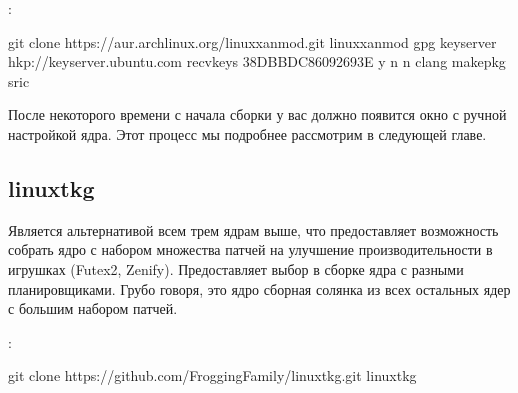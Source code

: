 \documentclass[letterpaper,10pt,russian,openany]{sphinxmanual}
\begin{document}
\sphinxAtStartPar
{}:

\begin{sphinxVerbatim}[commandchars=\\\{\}]
git clone https://aur.archlinux.org/linux\PYGZhy{}xanmod.git                    
 linux\PYGZhy{}xanmod                                                         
gpg \PYGZhy{}\PYGZhy{}keyserver hkp://keyserver.ubuntu.com \PYGZhy{}\PYGZhy{}recv\PYGZhy{}keys 38DBBDC86092693E 
 y n n clang         
makepkg \PYGZhy{}sric                                                           
\end{sphinxVerbatim}

\sphinxAtStartPar
После некоторого времени с начала сборки у вас должно появится окно с ручной настройкой ядра.
Этот процесс мы подробнее рассмотрим в следующей главе.

\noindent{}

\ignorespaces 

\subsection{linux\sphinxhyphen{}tkg}
\label{\detokenize{source/custom-kernels:linux-tkg}}\label{\detokenize{source/custom-kernels:index-4}}\label{\detokenize{source/custom-kernels:id5}}
\sphinxAtStartPar
Является альтернативой всем трем ядрам выше,
что предоставляет возможность собрать ядро с набором множества патчей на улучшение производительности в игрушках (Futex2, Zenify).
Предоставляет выбор в сборке ядра с разными планировщиками.
Грубо говоря, это ядро сборная солянка из всех остальных ядер с большим набором патчей.

\sphinxAtStartPar
{}:

\begin{sphinxVerbatim}[commandchars=\\\{\}]
git clone https://github.com/Frogging\PYGZhy{}Family/linux\PYGZhy{}tkg.git
 linux\PYGZhy{}tkg
\end{sphinxVerbatim}
\end{document}
